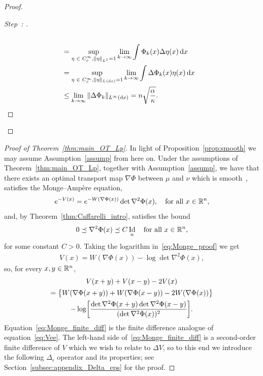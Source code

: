 \documentclass[AHL,Unicode,longabstracts]{cedram}
\newcommand{\R}{\mathbb R}
\DeclareMathOperator{\Id}{Id}
\newcommand{\V}{V}
\newcommand{\W}{W}
\newcommand{\dd}{n}
\newcommand{\source}{\mu}
\newcommand{\target}{\nu}
\newcommand{\lsh}{\alpha}
\newcommand{\lc}{\kappa}
\newcommand*\diff{\mathop{}\!\mathrm{d}}
\newcommand{\OT}{\Phi}
\renewcommand*{\to}{\mathchoice{\longrightarrow}{\rightarrow}{\rightarrow}{\rightarrow}}
\let\originalleft\left
\let\originalright\right
\renewcommand{\left}{\mathopen{}\mathclose\bgroup\originalleft}
\renewcommand{\right}{\aftergroup\egroup\originalright}
\let\oldin\in
\renewcommand{\in}{\mathchoice{\oldin}{\oldin}{\,\oldin\,}{\,\oldin\,}}
\newcounter{setofstep}
\newcounter{step}[setofstep]
\newenvironment{step}[1][]{\refstepcounter{step}\begin{proof}[{Step~\thestep\if#1\empty\else: #1\fi}]}{\let\qed\relax\end{proof}}
\begin{document}
\begin{proof}
\begin{step}
\begin{align*}
\\
&=\sup_{\substack{\eta \in C_{c}^{\infty}, \|\eta\|_{L^1}=1}} \lim_{k \to \infty} \int \Phi_{k}(x) \Delta \eta(x) \diff x\\
&=\sup_{\eta \in C_{c}^{\infty}, \|\eta\|_{L^{}(\diff x)}=1} \lim_{k \to \infty} \int \Delta \Phi_{k}(x) \eta(x) \diff x
\\
&\le \lim_{k\to \infty} \|\Delta \Phi_{k}\|_{L^{\infty}(\diff x)}=\dd\sqrt{ \frac{\lsh}{\lc}}.\qedhere
\end{align*}
\end{step}\let\qed\relax
\end{proof}


\begin{proof}[Proof of Theorem~\ref{thm:main_OT_Lp}]
In light of Proposition~\ref{prop:smooth} we may assume Assumption~\ref{assump} from here on. Under the assumptions of Theorem~\ref{thm:main_OT_Lp}, together with Assumption~\ref{assump}, we have that there exists an optimal transport map $\nabla\OT$ between $\source$ and $\target$ which is smooth~\cite[Theorem~1.1]{Dario2019}, satisfies the Monge--Ampère equation,
\begin{equation}\label{eq:Monge_proof}
e^{-\V(x)}=e^{-\W(\nabla \OT(x))}\det\nabla^2\OT(x), \quad \text{for all }x\in \R^{\dd},
\end{equation}
and, by Theorem~\ref{thm:Caffarelli_intro}, satisfies the bound
\begin{equation}\label{eq:Caffarelli_bound}
0\preceq\nabla^2\OT(x)\preceq C\Id_{\dd}\quad \text{for all }x\in \R^{\dd},
\end{equation}
for some constant $C>0$. Taking the logarithm in~\eqref{eq:Monge_proof} we get
\begin{align}\label{eq:Monge_log}
\V(x)=\W(\nabla\OT(x))-\log \det \nabla^2\OT(x),
\end{align}
so, for every $x,y\in \R^{\dd}$,
\begin{multline}\label{eq:Monge_finite_diff}
V(x+y)+V(x-y)-2V(x)\\
=\bigl\{\W(\nabla\OT(x+y))+\W(\nabla\OT(x-y))-2\W(\nabla\OT(x))\bigr\}
\\
-\log\left[\frac{\det \nabla^2\OT(x+y)\det \nabla^2\OT(x-y)}{(\det \nabla^2\OT(x))^2}\right].
\end{multline}
Equation~\eqref{eq:Monge_finite_diff} is the finite difference analogue of equation~\eqref{eq:Vee}. The left-hand side of~\eqref{eq:Monge_finite_diff} is a second-order finite difference of $\V$ which we wish to relate to $\Delta\V$, so to this end we introduce the following $\Delta_{\epsilon}$ operator and its properties; see Section~\ref{subsec:appendix_Delta_eps} for the proof.



\end{proof}
\end{document}
